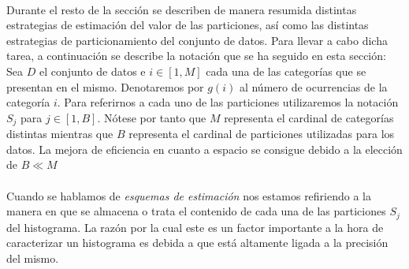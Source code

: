 \documentclass{subfiles}
\begin{document}
        \paragraph{}
        Durante el resto de la sección se describen de manera resumida distintas estrategias de estimación del valor de las particiones, así como las distintas estrategias de particionamiento del conjunto de datos. Para llevar a cabo dicha tarea, a continuación se describe la notación que se ha seguido en esta sección: Sea $D$ el conjunto de datos e $i \in [1,M]$ cada una de las categorías que se presentan en el mismo. Denotaremos por $g(i)$ al número de ocurrencias de la categoría $i$. Para referirnos a cada uno de las particiones utilizaremos la notación $S_j$ para $j \in [1, B]$. Nótese por tanto que $M$ representa el cardinal de categorías distintas mientras que $B$ representa el cardinal de particiones utilizadas para  los datos. La mejora de eficiencia en cuanto a espacio se consigue debido a la elección de $B \ll M$

        \paragraph{}
        Cuando se hablamos de \emph{esquemas de estimación} nos estamos refiriendo a la manera en que se almacena o trata el contenido de cada una de las particiones $S_j$ del histograma. La razón por la cual este es un factor importante a la hora de caracterizar un histograma es debida a que está altamente ligada a la precisión del mismo.
\end{document}
